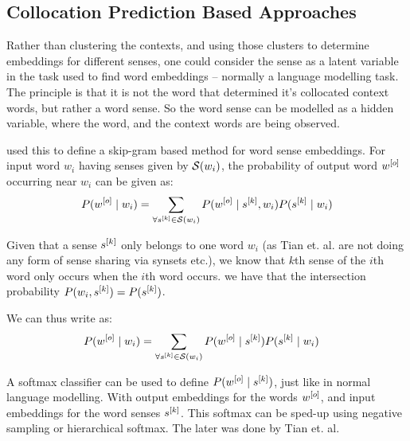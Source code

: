 \documentclass[12pt,parskip]{komatufte}
\begin{document}
\subsection{Collocation Prediction Based Approaches}
Rather than clustering the contexts, and using those clusters to determine embeddings for different senses, one could consider the sense as a latent variable in the task used to find word embeddings -- normally a language modelling task.
The principle is that it is not the word that determined it's collocated context words,
but rather a word sense.
So the word sense can be modelled as a hidden variable, where the word, and the context words are being observed.

 used this to define a  skip-gram based method for word sense embeddings.
For input word $w_i$ having senses given by $\mathcal{S}(w_i)$,
the probability of output word $\n w_o$ occurring near $w_i$ can be given as:
\begin{equation}
	P(\n w_o\mid w_i) = \sum_{\forall \n s_k \in \seq S(w_i)} P(\n w_o \mid \n s_k, w_i) P(\n s_k \mid w_i) \label{equ:tianmm}
\end{equation}

Given that a sense $\n s_k$ only belongs to one word $w_i$ (as Tian et. al. are not doing any form of sense sharing via synsets etc.),
we know that $k$th sense of the $i$th word only occurs when the $i$th word occurs.
we have that the intersection probability $P(w_i,\n s_k) = P(\n s_k)$.

We can thus write  as:
\begin{align}
P(\n w_o\mid w_i) &= \sum_{\forall \n s_k \in \seq S(w_i)} P(\n w_o \mid \n s_k) P(\n s_k \mid w_i) \label{equ:tianmm2}
\end{align}

A softmax classifier can be used to define $P(\n w_o \mid \n s_k)$, just like in normal language modelling.
With output embeddings for the words $\n w_o$, and input embeddings for the word senses $\n s_k$.
This softmax can be sped-up using negative sampling or hierarchical softmax.
The later was done by Tian et. al.
\end{document}
